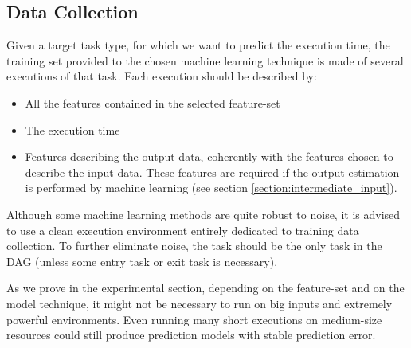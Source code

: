 \documentclass[a4paper, 10pt, conference]{ieeeconf}      %
\begin{document}
\subsection{Data Collection}
\label{subsec:data-collection}
Given a target task type, for which we want to predict the execution time, the training set provided to the chosen machine learning technique is made of several executions of that task.
Each execution should be described by:
\begin{itemize}
    \item All the features contained in the selected feature-set
    \item The execution time
    \item Features describing the output data, coherently with the features chosen to describe the input data. These features are required if the output estimation is performed by machine learning (see section \ref{section:intermediate_input}).
\end{itemize}
Although some machine learning methods are quite robust to noise, it is advised to use a clean execution environment entirely dedicated to training data collection. To further eliminate noise, the task should be the only task in the DAG (unless some entry task or exit task is necessary).

As we prove in the experimental section, depending on the feature-set and on the model technique, it might not be necessary to run on big inputs and extremely powerful environments. Even running many short executions on medium-size resources could still produce prediction models with stable prediction error.


\end{document}
